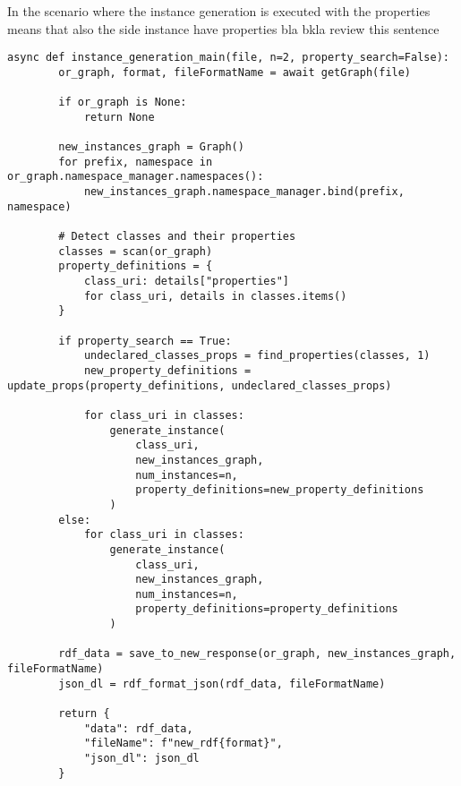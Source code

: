 	In the scenario where the instance generation is executed with the properties means that also the side instance have properties bla bkla review this sentence

\begin{lstlisting}[caption={Main Function for RDF Instance Generation}, label={lst:instance_generation_main}]
	async def instance_generation_main(file, n=2, property_search=False):
		or_graph, format, fileFormatName = await getGraph(file)
	
		if or_graph is None:
			return None
	
		new_instances_graph = Graph()
		for prefix, namespace in or_graph.namespace_manager.namespaces():
			new_instances_graph.namespace_manager.bind(prefix, namespace)
	
		# Detect classes and their properties
		classes = scan(or_graph)
		property_definitions = {
			class_uri: details["properties"]
			for class_uri, details in classes.items()
		}
	
		if property_search == True:
			undeclared_classes_props = find_properties(classes, 1)
			new_property_definitions = update_props(property_definitions, undeclared_classes_props)
	
			for class_uri in classes:
				generate_instance(
					class_uri,
					new_instances_graph,
					num_instances=n,
					property_definitions=new_property_definitions
				)
		else:
			for class_uri in classes:
				generate_instance(
					class_uri,
					new_instances_graph,
					num_instances=n,
					property_definitions=property_definitions
				)
	
		rdf_data = save_to_new_response(or_graph, new_instances_graph, fileFormatName)
		json_dl = rdf_format_json(rdf_data, fileFormatName)
	
		return {
			"data": rdf_data,
			"fileName": f"new_rdf{format}",
			"json_dl": json_dl
		}
	\end{lstlisting}


